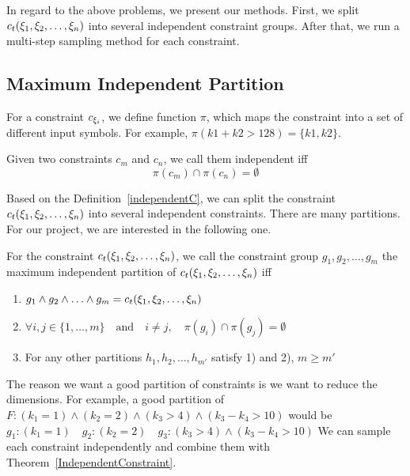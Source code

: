 In regard to the above problems, we present our methods. First, we split
$c_t({\xi}_{1},{\xi}_{2},\ldots,{\xi}_{n})$ into several independent constraint
groups. After that, we run a multi-step sampling method for each constraint.

\subsection{Maximum Independent Partition}

For a constraint $c_{{\xi}_{i}}$, we define function $\pi$, which maps the
constraint into a set of different input symbols. For example, $\pi(k1 + k2 >
128) = \{k1, k2\}$.

\begin{mydef}[]
      \label{independentC}
      Given two constraints $c_m$ and $c_n$, we call them independent iff
      $$\pi(c_m) \cap \pi(c_n) = \emptyset$$
\end{mydef}

Based on the Definition~\ref{independentC}, we can split the constraint
$c_t({\xi}_{1},{\xi}_{2},\ldots,{\xi}_{n})$ into several independent constraints.
There are many partitions. For our project, we are interested in the following
one.

\begin{mydef}\label{Goodpartition}
      For the constraint $c_t({\xi}_{1},{\xi}_{2},\ldots,{\xi}_{n})$,
      we call the constraint group
      $g_{1}, g_{2}, \ldots, g_{m}$
      the maximum independent partition of $c_t({\xi}_{1},{\xi}_{2},\ldots,{\xi}_{n})$ iff
      \begin{enumerate}
            \item $g_{1} \land g_{2} \land \ldots \land g_{m} = c_t({\xi}_{1},{\xi}_{2},\ldots,{\xi}_{n})$
            \item $\forall i, j \in \{1, \ldots, m\} \quad \textrm{and} \quad
                        i \neq j,\quad\pi(g_{i}) \cap \pi(g_{j}) = \emptyset $
            \item For any other partitions  $h_{1}, h_{2}, \ldots, h_{m'}$ satisfy 1) and
                  2), $m \geq m'$
      \end{enumerate}

\end{mydef}

The reason we want a good partition of constraints is we want to reduce
the dimensions. For example,
a good partition of $F: ({k_1} = 1)\land({k_2} = 2)\land({k_3} > 4)\land({k_3} - {k_4} > 10)$ would be
$g_{1}: ({k_1} = 1)\quad g_{2}: ({k_2} = 2)\quad g_{3}: ({k_3} > 4) \land
({k_3} - {k_4} > 10)$  
We can sample each constraint independently and combine them
with Theorem~\ref{IndependentConstraint}.

